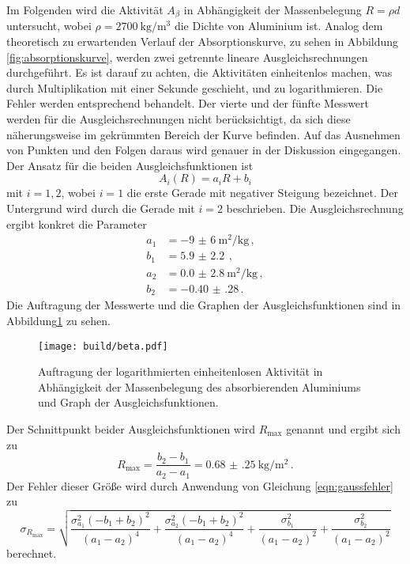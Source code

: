 Im Folgenden wird die Aktivität $A_\beta$ in Abhängigkeit der Massenbelegung $R = \rho d$
untersucht, wobei $\rho = \SI{2700}{\kilo\gram\per\meter\cubed}$ die Dichte von Aluminium ist.
Analog dem theoretisch zu erwartenden Verlauf der Absorptionskurve, zu sehen in Abbildung \ref{fig:absorptionskurve},
werden zwei getrennte lineare Ausgleichsrechnungen durchgeführt. Es ist darauf zu achten, die Aktivitäten
einheitenlos machen, was durch Multiplikation mit einer Sekunde geschieht, und zu logarithmieren. Die Fehler werden entsprechend behandelt. Der vierte und der fünfte Messwert
werden für die Ausgleichsrechnungen nicht berücksichtigt, da sich diese näherungsweise im gekrümmten Bereich
der Kurve befinden. Auf das Ausnehmen von Punkten und den Folgen daraus wird genauer in der Diskussion eingegangen.
Der Ansatz für die beiden Ausgleichsfunktionen ist
\begin{equation*}
  A_i(R) = a_i R + b_i
\end{equation*}
mit $i=1{,}2$, wobei $i=1$ die erste Gerade mit negativer Steigung bezeichnet. Der Untergrund
wird durch die Gerade mit $i=2$ beschrieben.
Die Ausgleichsrechnung ergibt konkret die Parameter
\begin{align*}
  a_1 &= \SI{-9(6)}{\meter\squared\per\kilo\gram}\,,\\
  b_1 &= \SI{5.9(22)}{}\,,\\
  a_2 &= \SI{0.0(28)}{\meter\squared\per\kilo\gram}\,,\\
  b_2 &= \SI{-0.40(28)}\,.
\end{align*}
Die Auftragung der Messwerte und die Graphen der Ausgleichsfunktionen sind in Abbildung\ref{fig:beta} zu sehen.
\begin{figure}
  \centering
  \texttt{[image: build/beta.pdf]}
  \caption{Auftragung der logarithmierten einheitenlosen Aktivität in Abhängigkeit der Massenbelegung des absorbierenden Aluminiums und Graph der Ausgleichsfunktionen.}
  \label{fig:beta}
\end{figure}
Der Schnittpunkt beider Ausgleichsfunktionen wird $R_\text{max}$ genannt und ergibt sich zu
\begin{equation*}
  R_\text{max} = \frac{b_2-b_1}{a_2-a_1} = \SI{0.68(25)}{\kilo\gram\per\meter\squared}\,.
\end{equation*}
Der Fehler dieser Größe wird durch Anwendung von Gleichung \eqref{eqn:gaussfehler}
zu
\begin{equation*}
  \sigma_{R_\text{max}} =
  \sqrt{\frac{\sigma_{a_{1}}^{2} \left(- b_{1} + b_{2}\right)^{2}}{\left(a_{1} - a_{2}\right)^{4}}
  + \frac{\sigma_{a_{2}}^{2} \left(- b_{1} + b_{2}\right)^{2}}{\left(a_{1} - a_{2}\right)^{4}}
  + \frac{\sigma_{b_{1}}^{2}}{\left(a_{1} - a_{2}\right)^{2}} + \frac{\sigma_{b_{2}}^{2}}{\left(a_{1} - a_{2}\right)^{2}}}
\end{equation*}
berechnet.

